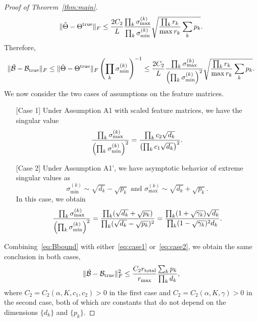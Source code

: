 \documentclass[12pt]{article}
\theoremstyle{definition}
\theoremstyle{definition}
\begin{document}
\begin{proof}[Proof of Theorem~\ref{thm:main}]
\begin{align}\label{eq:theta}
\lVert\hat \Theta-\Theta^{\text{true}}\rVert_F \leq {2C_2\over L} \frac{\prod_k \sigma_{\max}^{(k)}}{\prod_k \sigma_{\min}^{(k)}}\sqrt{{\prod_k r_k \over \max r_k}\sum_k p_k}.
\end{align}
Therefore,
\begin{equation}\label{eq:Bbound}
\lVert\hat {\mathcal{B}}-\mathcal{B}_{\textup{true}}\rVert_F\leq \lVert\hat \Theta-\Theta^{\text{true}}\rVert_F\left(\prod_k \sigma_{\min}^{(k)}\right)^{-1}\leq {2C_2\over L} \frac{\prod_k \sigma_{\max}^{(k)}}{\left(\prod_k \sigma_{\min}^{(k)}\right)^2}\sqrt{{\prod_k r_k \over \max r_k}\sum_k p_k}.
\end{equation}
We now consider the two cases of assumptions on the feature matrices. 
\begin{itemize}[leftmargin=0cm]
\item[] [Case 1] Under Assumption A1 with scaled feature matrices, we have the singular value
\begin{equation}\label{eq:case1}
\frac{\prod_k \sigma_{\max}^{(k)}}{\left(\prod_k \sigma_{\min}^{(k)}\right)^2} = {\prod_k c_2\sqrt{d_k}\over \left(\prod_k c_1\sqrt{d_k}\right)^2}.
\end{equation}
\item[] [Case 2] Under Assumption A1', we have asymptotic behavior of extreme singular values  \citep{rudelson2010non} as 
\[
\sigma_{\text{min}}^{(k)} \sim \sqrt{d_k}-\sqrt{p_k} \text{ and  } \sigma_{\text{max}}^{(k)} \sim \sqrt{d_k}+\sqrt{p_k}.
\]
In this case, we obtain 
\begin{equation}\label{eq:case2}
\frac{\prod_k \sigma_{\max}^{(k)}}{\left(\prod_k \sigma_{\min}^{(k)}\right)^2} = {\prod_k (\sqrt{d_k}+\sqrt{p_k})\over \prod_k (\sqrt{d_k}-\sqrt{p_k})^2} =\frac{\prod_k(1+\sqrt{\gamma_k})\sqrt{d_k}}{\prod_k(1-\sqrt{\gamma_k})^2d_k}.
\end{equation}
\end{itemize}
Combining~\eqref{eq:Bbound} with either~\eqref{eq:case1} or~\eqref{eq:case2}, we obtain the same conclusion in both cases,
\[
\lVert\hat {\mathcal{B}}-\mathcal{B}_{\textup{true}}\rVert_F^2\leq \frac{ C_{2} r_{\textup{total}}}{r_{\max}}\frac{\sum_k p_k}{\prod_k d_k},
\]
where $C_2=C_2(\alpha,K,c_1, c_2)>0$ in the first case and $C_2=C_2(\alpha,K,\gamma)>0$ in the second case, both of which are constants that do not depend on the dimensions $\{d_k\}$ and $\{p_k\}$. 


\end{proof}
\end{document}
